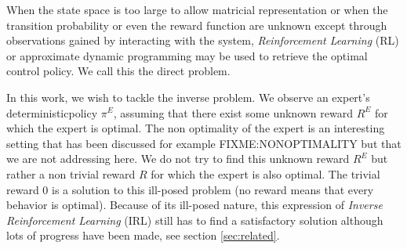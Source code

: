 \documentclass[11pt]{article}
\begin{document}
When the state space is too large to allow matricial representation or when the transition probability or even the reward function are unknown except through observations gained by interacting with the system, \emph{Reinforcement Learning} (RL) or approximate dynamic programming may be used to retrieve the optimal control policy. We call this the direct problem.

In this work, we wish to tackle the inverse problem. We observe an expert's deterministic\footnotemark[\value{footnote}] policy $\pi^E$, assuming that there exist some unknown reward $R^E$ for which the expert is optimal. The non optimality of the expert is an interesting setting that has been discussed for example FIXME:NONOPTIMALITY but that we are not addressing here. We do not try to find this unknown reward $R^E$ but rather a non trivial reward $R$ for which the expert is also optimal. The trivial reward $0$ is a solution to this ill-posed problem (no reward means that every behavior is optimal). Because of its ill-posed nature, this expression of \emph{Inverse Reinforcement Learning} (IRL) still has to find a satisfactory solution although lots of progress have been made, see section \ref{sec:related}.
\end{document}
